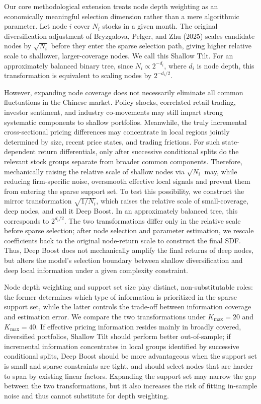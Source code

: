 \documentclass[12pt]{article}
\begin{document}
Our core methodological extension treats node depth weighting as an economically meaningful selection dimension rather than a mere algorithmic parameter. Let node \(i\) cover \(N_i\) stocks in a given month. The original diversification adjustment of Bryzgalova, Pelger, and Zhu (2025) scales candidate nodes by \(\sqrt{N_i}\) before they enter the sparse selection path, giving higher relative scale to shallower, larger-coverage nodes. We call this Shallow Tilt. For an approximately balanced binary tree, since \(N_i\propto 2^{-d_i}\), where \(d_i\) is node depth, this transformation is equivalent to scaling nodes by \(2^{-d_i/2}\).

However, expanding node coverage does not necessarily eliminate all common fluctuations in the Chinese market. Policy shocks, correlated retail trading, investor sentiment, and industry co-movements may still impart strong systematic components to shallow portfolios. Meanwhile, the truly incremental cross-sectional pricing differences may concentrate in local regions jointly determined by size, recent price states, and trading frictions. For such state-dependent return differentials, only after successive conditional splits do the relevant stock groups separate from broader common components. Therefore, mechanically raising the relative scale of shallow nodes via \(\sqrt{N_i}\) may, while reducing firm-specific noise, oversmooth effective local signals and prevent them from entering the sparse support set. To test this possibility, we construct the mirror transformation \(\sqrt{1/N_i}\), which raises the relative scale of small-coverage, deep nodes, and call it Deep Boost. In an approximately balanced tree, this corresponds to \(2^{d_i/2}\). The two transformations differ only in the relative scale before sparse selection; after node selection and parameter estimation, we rescale coefficients back to the original node-return scale to construct the final SDF. Thus, Deep Boost does not mechanically amplify the final returns of deep nodes, but alters the model's selection boundary between shallow diversification and deep local information under a given complexity constraint.

Node depth weighting and support set size play distinct, non-substitutable roles: the former determines which type of information is prioritized in the sparse support set, while the latter controls the trade-off between information coverage and estimation error. We compare the two transformations under \(K_{\max}=20\) and \(K_{\max}=40\). If effective pricing information resides mainly in broadly covered, diversified portfolios, Shallow Tilt should perform better out-of-sample; if incremental information concentrates in local groups identified by successive conditional splits, Deep Boost should be more advantageous when the support set is small and sparse constraints are tight, and should select nodes that are harder to span by existing linear factors. Expanding the support set may narrow the gap between the two transformations, but it also increases the risk of fitting in-sample noise and thus cannot substitute for depth weighting.
\end{document}

